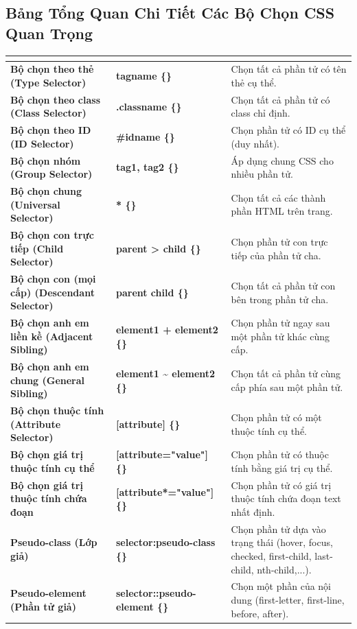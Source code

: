 \subsection{Bảng Tổng Quan Chi Tiết Các Bộ Chọn CSS Quan Trọng}

\begin{prettyTableBox}
\sffamily\small
\begin{tabularx}{\linewidth}{|>{\bfseries\color{primaryBlue}}K{3.8cm}|>{\ttfamily\color{darkText}\bfseries}K{3.5cm}|Z|}
\hline
{}  &  &  \\
\hline
Bộ chọn theo thẻ (Type Selector) & tagname \{\} & Chọn tất cả phần tử có tên thẻ cụ thể. \\
\hline
Bộ chọn theo class (Class Selector) & .classname \{\} & Chọn tất cả phần tử có class chỉ định. \\
\hline
Bộ chọn theo ID (ID Selector) & \#idname \{\} & Chọn phần tử có ID cụ thể (duy nhất). \\
\hline
Bộ chọn nhóm (Group Selector) & tag1, tag2 \{\} & Áp dụng chung CSS cho nhiều phần tử. \\
\hline
Bộ chọn chung (Universal Selector) & * \{\} & Chọn tất cả các thành phần HTML trên trang. \\
\hline
Bộ chọn con trực tiếp (Child Selector) & parent > child \{\} & Chọn phần tử con trực tiếp của phần tử cha. \\
\hline
Bộ chọn con (mọi cấp) (Descendant Selector) & parent child \{\} & Chọn tất cả phần tử con bên trong phần tử cha. \\
\hline
Bộ chọn anh em liền kề (Adjacent Sibling) & element1 + element2 \{\} & Chọn phần tử ngay sau một phần tử khác cùng cấp. \\
\hline
Bộ chọn anh em chung (General Sibling) & element1 \textasciitilde{} element2 \{\} & Chọn tất cả phần tử cùng cấp phía sau một phần tử. \\
\hline
Bộ chọn thuộc tính (Attribute Selector) & [attribute] \{\} & Chọn phần tử có một thuộc tính cụ thể. \\
\hline
Bộ chọn giá trị thuộc tính cụ thể & [attribute="value"] \{\} & Chọn phần tử có thuộc tính bằng giá trị cụ thể. \\
\hline
Bộ chọn giá trị thuộc tính chứa đoạn & [attribute*="value"] \{\} & Chọn phần tử có giá trị thuộc tính chứa đoạn text nhất định. \\
\hline
Pseudo-class (Lớp giả) & selector:pseudo-class \{\} & Chọn phần tử dựa vào trạng thái (hover, focus, checked, first-child, last-child, nth-child,...). \\
\hline
Pseudo-element (Phần tử giả) & selector::pseudo-element \{\} & Chọn một phần của nội dung (first-letter, first-line, before, after). \\
\hline
\end{tabularx}
\end{prettyTableBox}


